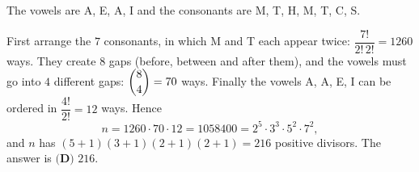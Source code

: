 The vowels are A, E, A, I and the consonants are M, T, H, M, T, C, S.

First arrange the $7$ consonants, in which M and T each appear twice: $\dfrac{7!}{2!\,2!}=1260$ ways. They create $8$ gaps (before, between and after them), and the vowels must go into $4$ different gaps: $\dbinom84=70$ ways. Finally the vowels A, A, E, I can be ordered in $\dfrac{4!}{2!}=12$ ways. Hence
\[
n=1260\cdot70\cdot12=1058400=2^5\cdot3^3\cdot5^2\cdot7^2,
\]
and $n$ has $(5+1)(3+1)(2+1)(2+1)=216$ positive divisors. The answer is $\boxed{\textbf{(D) }216}$.
